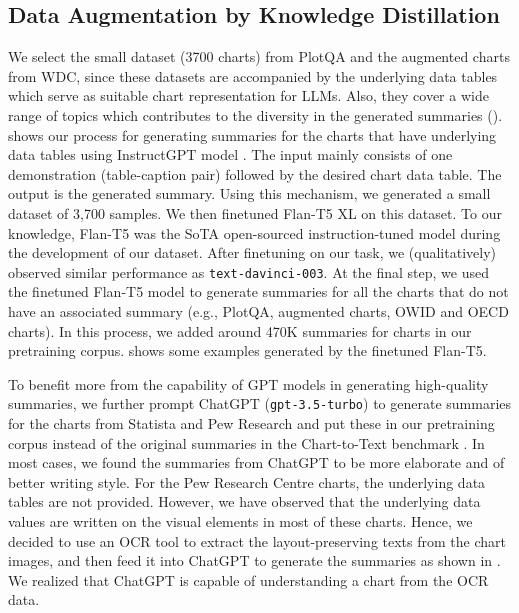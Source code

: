 \subsection{Data Augmentation by Knowledge Distillation}
\label{app:knowledge-distillation}

 We select the small dataset (3700 charts) from PlotQA and the augmented charts from WDC, since these datasets are accompanied by the underlying data tables which serve as suitable chart representation for LLMs. Also, they cover a wide range of topics which contributes to the diversity in the generated summaries ().  shows our process for generating summaries for the charts that have underlying data tables using InstructGPT model \cite{instructgpt}. The input mainly consists of one demonstration (table-caption pair) followed by the desired chart data table. The output is the generated summary. Using this mechanism, we generated a small dataset of 3,700 samples. We then finetuned Flan-T5 XL \cite{chung2022scaling} on this dataset. To our knowledge, Flan-T5 was the SoTA open-sourced instruction-tuned model during the development of our dataset. After finetuning on our task, we (qualitatively) observed similar performance as \texttt{text-davinci-003}. At the final step, we used the finetuned Flan-T5 model to generate summaries for all the charts that do not have an associated summary (e.g., PlotQA, augmented charts, OWID and OECD charts). In this process, we added around 470K  summaries for charts in our pretraining corpus.  shows some examples generated by the finetuned Flan-T5.
 
 

To benefit more from the capability of GPT models in generating high-quality summaries, we further prompt ChatGPT (\texttt{gpt-3.5-turbo}) \cite{ChatGPT} to generate summaries for the charts from Statista and Pew Research and put these in our pretraining corpus instead of the original summaries in the Chart-to-Text benchmark \cite{chart-to-text-acl}. In most cases, we found the summaries from ChatGPT to be more elaborate and of better writing style.  For the Pew Research Centre charts, the underlying data tables are not provided. However, we have observed that the underlying data values are written on the visual elements in most of these charts. Hence, we decided to use an OCR tool to extract the layout-preserving texts from the chart images, and then feed it into ChatGPT to generate the summaries as shown in . We realized that ChatGPT is capable of understanding a chart from the OCR data.





